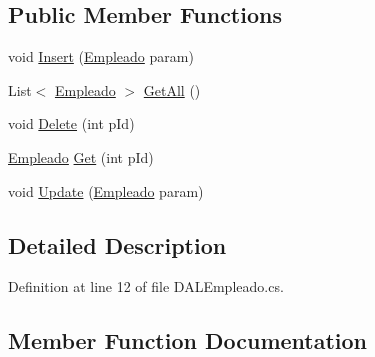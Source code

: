 \subsection*{Public Member Functions}
\begin{DoxyCompactItemize}
\item 
void \hyperlink{classprj_progra_i_i_i_1_1_layer_1_1_d_a_l_1_1_d_a_l_empleado_a8593713e7bb16c32041cd8b342cfd3ec}{Insert} (\hyperlink{classprj_progra_i_i_i_1_1_layer_1_1_entities_1_1_empleado}{Empleado} param)
\item 
List$<$ \hyperlink{classprj_progra_i_i_i_1_1_layer_1_1_entities_1_1_empleado}{Empleado} $>$ \hyperlink{classprj_progra_i_i_i_1_1_layer_1_1_d_a_l_1_1_d_a_l_empleado_ae4244254c51367a0332e10ffc7e68fcc}{Get\+All} ()
\item 
void \hyperlink{classprj_progra_i_i_i_1_1_layer_1_1_d_a_l_1_1_d_a_l_empleado_a85ce6a93aea851d43025d0ff443d7c3d}{Delete} (int p\+Id)
\item 
\hyperlink{classprj_progra_i_i_i_1_1_layer_1_1_entities_1_1_empleado}{Empleado} \hyperlink{classprj_progra_i_i_i_1_1_layer_1_1_d_a_l_1_1_d_a_l_empleado_a0f1fb578c7f7284e5bdd88be66eb8641}{Get} (int p\+Id)
\item 
void \hyperlink{classprj_progra_i_i_i_1_1_layer_1_1_d_a_l_1_1_d_a_l_empleado_ab97689057c451afa71447c434bbac131}{Update} (\hyperlink{classprj_progra_i_i_i_1_1_layer_1_1_entities_1_1_empleado}{Empleado} param)
\end{DoxyCompactItemize}


\subsection{Detailed Description}


Definition at line 12 of file D\+A\+L\+Empleado.\+cs.



\subsection{Member Function Documentation}
\hypertarget{classprj_progra_i_i_i_1_1_layer_1_1_d_a_l_1_1_d_a_l_empleado_a85ce6a93aea851d43025d0ff443d7c3d}{}\label{classprj_progra_i_i_i_1_1_layer_1_1_d_a_l_1_1_d_a_l_empleado_a85ce6a93aea851d43025d0ff443d7c3d} 
